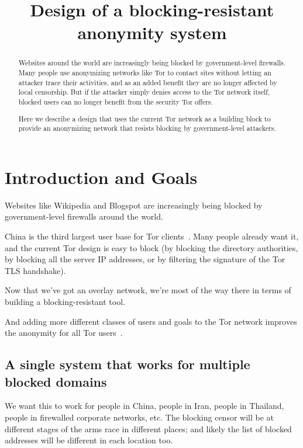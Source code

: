 \documentclass{llncs}
\begin{document}
\title{Design of a blocking-resistant anonymity system}

\author{}

\maketitle
\pagestyle{plain}

\begin{abstract}

Websites around the world are increasingly being blocked by
government-level firewalls. Many people use anonymizing networks like
Tor to contact sites without letting an attacker trace their activities,
and as an added benefit they are no longer affected by local censorship.
But if the attacker simply denies access to the Tor network itself,
blocked users can no longer benefit from the security Tor offers.

Here we describe a design that uses the current Tor network as a
building block to provide an anonymizing network that resists blocking
by government-level attackers.

\end{abstract}

\section{Introduction and Goals}

Websites like Wikipedia and Blogspot are increasingly being blocked by
government-level firewalls around the world.

China is the third largest user base for Tor clients~\cite{geoip-tor}.
Many people already want it, and the current Tor design is easy to block
(by blocking the directory authorities, by blocking all the server
IP addresses, or by filtering the signature of the Tor TLS handshake).

Now that we've got an overlay network, we're most of the way there in
terms of building a blocking-resistant tool.

And adding more different classes of users and goals to the Tor network
improves the anonymity for all Tor users~\cite{econymics,tor-weis06}.

\subsection{A single system that works for multiple blocked domains}

We want this to work for people in China, people in Iran, people in
Thailand, people in firewalled corporate networks, etc. The blocking
censor will be at different stages of the arms race in different places;
and likely the list of blocked addresses will be different in each
location too.
\end{document}
